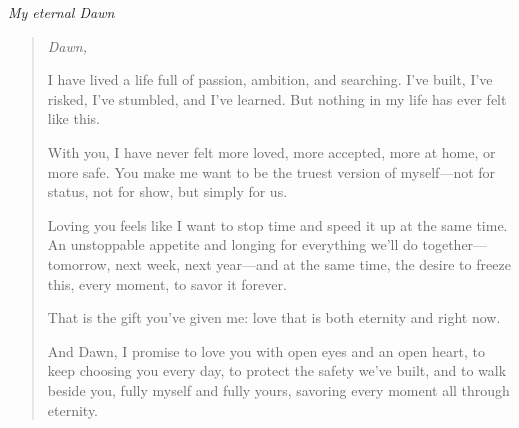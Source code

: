 \thispagestyle{empty}
\vspace*{\fill}
\begin{center}
{\Large\itshape My eternal Dawn}
\end{center}
\vspace{1.4em}
\begin{quote}
\itshape
\noindent Dawn,
\par\medskip
I have lived a life full of passion, ambition, and searching. I've built, I've
risked, I've stumbled, and I've learned. But nothing in my life has ever felt like
this.
\par\medskip
With you, I have never felt more loved, more accepted, more at home, or more safe.
You make me want to be the truest version of myself---not for status, not for show,
but simply for us.
\par\medskip
Loving you feels like I want to stop time and speed it up at the same time. An
unstoppable appetite and longing for everything we'll do together---tomorrow, next
week, next year---and at the same time, the desire to freeze this, every moment, to
savor it forever.
\par\medskip
That is the gift you've given me: love that is both eternity and right now.
\par\medskip
And Dawn, I promise to love you with open eyes and an open heart, to keep choosing
you every day, to protect the safety we've built, and to walk beside you, fully
myself and fully yours, savoring every moment all through eternity.
\end{quote}
\vspace*{\fill}
\clearpage
